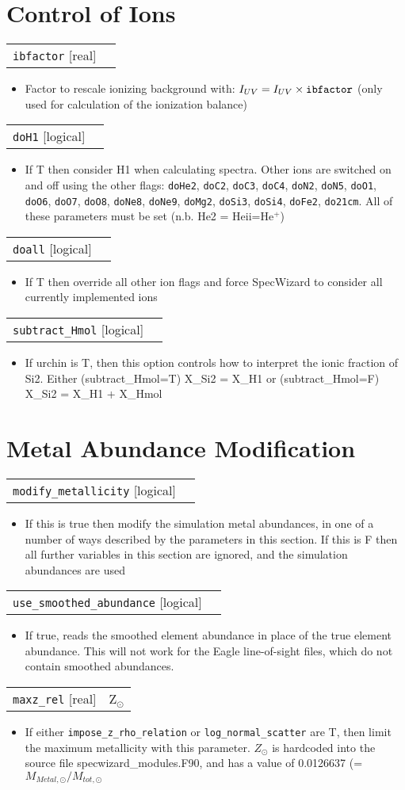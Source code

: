 \documentclass{report}
\makeatletter
\newcommand{\paramdefinition}[3]{
\begin{tabular*}{\textwidth}{l@{\extracolsep{\fill}}r}
		{\tt #1} [{\sc #2}]& #3 \\
\end{tabular*}}
\newcommand{\paramdescription}[1]{
\begin{itemize}
\item #1
\end{itemize}\vspace{0.2cm}}
\makeatother
\begin{document}
\section{Control of Ions}

\paramdefinition{ibfactor}{real}{}
\paramdescription{Factor to rescale ionizing background with: $I_{UV} = I_{UV}\times{\tt ibfactor}$ (only used for calculation of the ionization balance)}

\paramdefinition{doH1}{logical}{}
\paramdescription{If T then consider H1 when calculating spectra.  Other ions are switched on and off using the other flags: {\tt doHe2}, {\tt doC2}, {\tt doC3}, {\tt doC4}, {\tt doN2}, {\tt doN5}, {\tt doO1}, {\tt doO6}, {\tt doO7}, {\tt doO8}, {\tt doNe8}, {\tt doNe9}, {\tt doMg2}, {\tt doSi3}, {\tt doSi4}, {\tt doFe2}, {\tt do21cm}.  All of these parameters must be set (n.b. He2 = He{\sc ii}=He$^+$)}

\paramdefinition{doall}{logical}{}
\paramdescription{If T then override all other ion flags and force SpecWizard to consider all currently implemented ions}

\paramdefinition{subtract\_Hmol}{logical}{}
\paramdescription{If urchin is T, then this option controls how to interpret the ionic fraction of Si2. Either (subtract\_Hmol=T) X\_Si2 = X\_H1 or (subtract\_Hmol=F) X\_Si2 = X\_H1 + X\_Hmol}

\section{Metal Abundance Modification}
\paramdefinition{modify\_metallicity}{logical}{ }
\paramdescription{If this is true then modify the simulation metal abundances, in one of a number of ways described by the parameters in this section.  If this is F then all further variables in this section are ignored, and the simulation abundances are used}

\paramdefinition{use\_smoothed\_abundance}{logical}{}
\paramdescription{If true, reads the smoothed element abundance in place of the true element abundance. This will not work for the Eagle line-of-sight files, which do not contain smoothed abundances.}

\paramdefinition{maxz\_rel}{real}{Z$_{\odot}$}
\paramdescription{If either {\tt impose\_z\_rho\_relation} or {\tt log\_normal\_scatter} are T, then limit the maximum metallicity with this parameter.  $Z_{\odot}$ is hardcoded into the source file specwizard\_modules.F90, and has a value of 0.0126637  (=$M_{Metal,\odot}/M_{tot,\odot}$}
\end{document}
